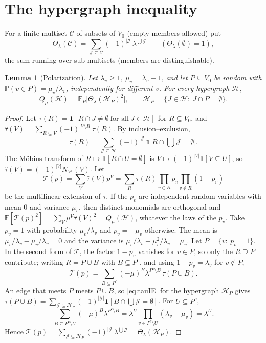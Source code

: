 \documentclass[11pt,reqno]{amsart}
\newtheorem{lemma}[theorem]{Lemma}
\theoremstyle{definition}
\newcommand{\E}{\mathbb E}
\newcommand{\PP}{\mathbb P}
\newcommand{\Ho}{\mathcal H}
\newcommand{\cJ}{\mathcal J}
\newcommand{\cC}{\mathcal C}
\begin{document}
\section{The hypergraph inequality}\label{sec:hyper}

For a finite multiset $\cC$ of subsets of $V_0$ (empty members allowed) put
\[
 \Theta_\lambda(\cC)=\sum_{\cJ\subseteq\cC}(-1)^{|\cJ|}\lambda^{\bigcup\cJ}\qquad(\Theta_\lambda(\emptyset)=1),
\]
the sum running over sub-multisets (members are distinguishable).

\begin{lemma}[Polarization]\label{lem:polar}
Let $\lambda_v\ge1$, $\mu_v=\lambda_v-1$, and let $P\subseteq V_0$ be random with
$\PP(v\in P)=\mu_v/\lambda_v$, independently for different $v$.  For every
hypergraph $\Ho$,
\[
 Q_\mu(\Ho)=\E_P\big[\Theta_\lambda(\Ho_P)^2\big],\qquad \Ho_P=\{J\in\Ho:\ J\cap P=\emptyset\}.
\]
\end{lemma}

\begin{proof}
Let $\tau(R)=\mathbf 1[R\cap J\ne\emptyset\ \text{for all}\ J\in\Ho]$ for $R\subseteq V_0$, and
$\hat\tau(V)=\sum_{R\subseteq V}(-1)^{|V\setminus R|}\tau(R)$.  By inclusion--exclusion,
\begin{equation}\label{eq:tauIE}
 \tau(R)=\sum_{\cJ\subseteq\Ho}(-1)^{|\cJ|}\mathbf 1\big[R\cap{\textstyle\bigcup}\cJ=\emptyset\big].
\end{equation}
The M\"obius transform of $R\mapsto\mathbf 1[R\cap U=\emptyset]$ is
$V\mapsto(-1)^{|V|}\mathbf 1[V\subseteq U]$, so $\hat\tau(V)=(-1)^{|V|}N_\Ho(V)$.  Let
\[
 \mathcal T(p)=\sum_V\hat\tau(V)p^V=\sum_R\tau(R)\prod_{v\in R}p_v\prod_{v\notin R}(1-p_v)
\]
be the multilinear extension of $\tau$.  If the $p_v$ are independent random
variables with mean $0$ and variance $\mu_v$, then distinct monomials are
orthogonal and $\E[\mathcal T(p)^2]=\sum_V\mu^V\hat\tau(V)^2=Q_\mu(\Ho)$, whatever the
laws of the $p_v$.  Take $p_v=1$ with probability $\mu_v/\lambda_v$ and $p_v=-\mu_v$
otherwise.  The mean is $\mu_v/\lambda_v-\mu_v/\lambda_v=0$ and the variance is
$\mu_v/\lambda_v+\mu_v^2/\lambda_v=\mu_v$.  Let $P=\{v:\ p_v=1\}$.  In the second form of $\mathcal T$,
the factor $1-p_v$ vanishes for $v\in P$, so only the $R\supseteq P$ contribute;
writing $R=P\cup B$ with $B\subseteq P^c$, and using $1-p_v=\lambda_v$ for $v\notin P$,
\[
 \mathcal T(p)=\sum_{B\subseteq P^c}(-\mu)^B\lambda^{P^c\setminus B}\,\tau(P\cup B).
\]
An edge that meets $P$ meets $P\cup B$, so \eqref{eq:tauIE} for the hypergraph
$\Ho_P$ gives $\tau(P\cup B)=\sum_{\cJ\subseteq\Ho_P}(-1)^{|\cJ|}\mathbf 1[B\cap\bigcup\cJ=\emptyset]$.  For
$U\subseteq P^c$,
\[
 \sum_{B\subseteq P^c\setminus U}(-\mu)^B\lambda^{P^c\setminus B}=\lambda^U\prod_{v\in P^c\setminus U}(\lambda_v-\mu_v)=\lambda^U .
\]
Hence $\mathcal T(p)=\sum_{\cJ\subseteq\Ho_P}(-1)^{|\cJ|}\lambda^{\bigcup\cJ}=\Theta_\lambda(\Ho_P)$.
\end{proof}
\end{document}
